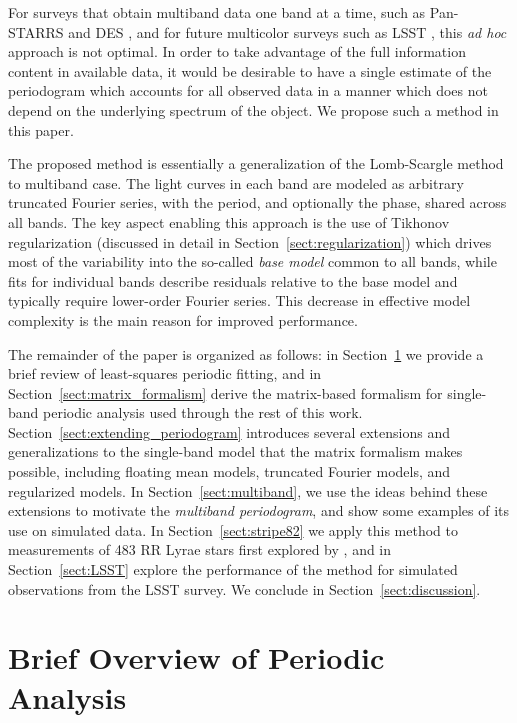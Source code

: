 \documentclass{emulateapj}
\newcommand{\foreign}[1]{{\it #1}}
\newcommand{\adhoc}{\foreign{ad hoc}}
\newcommand{\Sect}[1]{Section~\ref{sect:#1}}
\newcommand{\sect}[1]{\Sect{#1}}
\newcommand{\sectlabel}[1]{\label{sect:#1}}
\begin{document}
For surveys that obtain multiband data one band at a time, such as Pan-STARRS \citep{Kaiser2010} and DES \citep{Flaugher08},
and for future multicolor surveys such as LSST \citep{Ivezic08LSST}, this \adhoc{} approach is not optimal. In order to take 
advantage of the full information content in available data, it would be desirable to have a single estimate of the periodogram 
which accounts for all observed data in a manner which does not depend on the underlying spectrum of the object. 
We propose such a method in this paper. 

The proposed method is essentially a generalization of the Lomb-Scargle method to 
multiband case. The light curves in  each band are modeled as arbitrary truncated Fourier series, 
with the period, and optionally the phase, shared across all bands. The key aspect enabling this approach is the use of Tikhonov regularization 
(discussed in detail in \sect{regularization}) which drives most of the variability into the so-called {\it base 
model} common to all bands, while fits for individual bands describe residuals relative to the base model 
and typically require lower-order Fourier series. This decrease in effective model complexity is the
main reason for improved performance. 

The remainder of the paper is organized as follows:
in \sect{brief_overview} we provide a brief review of least-squares periodic fitting, and in \sect{matrix_formalism} derive the matrix-based formalism for single-band periodic analysis used through the rest of this work.
\sect{extending_periodogram} introduces several extensions and generalizations to the single-band model that the matrix formalism makes possible, including floating mean models, truncated Fourier models, and regularized models.
In \sect{multiband}, we use the ideas behind these extensions to motivate the {\it multiband periodogram}, and show some examples of its use on simulated data.
In \sect{stripe82} we apply this method to measurements of 483 RR Lyrae stars first explored by \citet[][hereafter S10]{Sesar2010}, and in \sect{LSST} explore the performance of the method for simulated observations from the LSST survey.
We conclude in \sect{discussion}.

\section{Brief Overview of Periodic Analysis}
\sectlabel{brief_overview}
\end{document}
